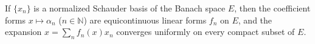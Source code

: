 If $\{x_n\}$ is a normalized Schauder basis of the Banach space $E$, then the coefficient forms $x \mapsto \alpha_n$ ($n \in \mathbb{N}$) are equicontinuous linear forms $f_n$ on $E$, and the expansion $x = \sum_{n} f_n(x)x_n$ converges uniformly on every compact subset of $E$.
